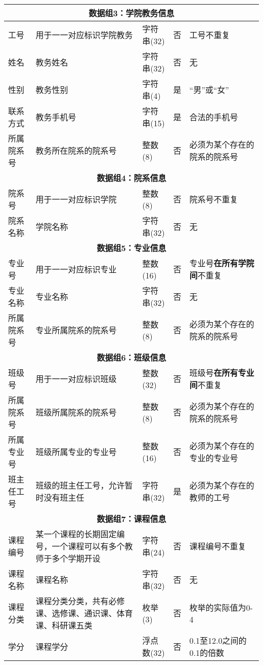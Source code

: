 \begin{center}
\begin{longtable}{p{6em}p{16em}p{8em}p{2em}p{16em}}
        \multicolumn{5}{c}{\textbf{数据组3：学院教务信息}} \\
        \midrule
        工号 & 用于一一对应标识学院教务 & 字符串(32) & 否 & 工号不重复 \\   
        姓名 & 教务姓名 & 字符串(32) & 否 & 无 \\
        性别 & 教务性别 & 字符串(4) & 是 & “男”或“女” \\
        联系方式 & 教务手机号 & 字符串(15) & 是 & 合法的手机号 \\
        所属院系号 & 教务所在院系的院系号 & 整数(8) & 否 & 必须为某个存在的院系的院系号 \\
        \midrule

        \multicolumn{5}{c}{\textbf{数据组4：院系信息}} \\
        \midrule
        院系号 & 用于一一对应标识学院 & 整数(8) & 否 & 院系号不重复 \\
        院系名称 & 学院名称 & 字符串(32) & 否 & 无 \\
        \midrule

        \multicolumn{5}{c}{\textbf{数据组5：专业信息}} \\
        \midrule
        专业号 & 用于一一对应标识专业 & 整数(16) & 否 & 专业号\textbf{在所有学院间}不重复 \\
        专业名称 & 专业名称 & 字符串(32) & 否 & 无 \\
        所属院系号 & 专业所属院系的院系号 & 整数(8) & 否 & 必须为某个存在的院系的院系号 \\
        \midrule

        \multicolumn{5}{c}{\textbf{数据组6：班级信息}} \\
        \midrule
        班级号 & 用于一一对应标识班级 & 整数(32) & 否 & 班级号\textbf{在所有专业间}不重复 \\
        所属院系号 & 班级所属院系的院系号 & 整数(8) & 否 & 必须为某个存在的院系的院系号 \\
        所属专业号 & 班级所属专业的专业号 & 整数(16) & 否 & 必须为某个存在的专业的专业号 \\
        班主任工号 & 班级的班主任工号，允许暂时没有班主任 & 字符串(32) & 是 & 必须为某个存在的教师的工号 \\
        \midrule

        \multicolumn{5}{c}{\textbf{数据组7：课程信息}} \\
        \midrule
        课程编号 & 某一个课程的长期固定编号，一个课程可以有多个教师于多个学期开设 & 字符串(24) & 否 & 课程编号不重复 \\
        课程名称 & 课程名称 & 字符串(32) & 否 & 无 \\
        课程分类 & 课程分类分类，共有必修课、选修课、通识课、体育课、科研课五类 & 枚举(3) & 否 & 枚举的实际值为0-4 \\
        学分 & 课程学分 & 浮点数(32) & 否 & 0.1至12.0之间的0.1的倍数 \\
        \midrule


\end{longtable}
\end{center}
